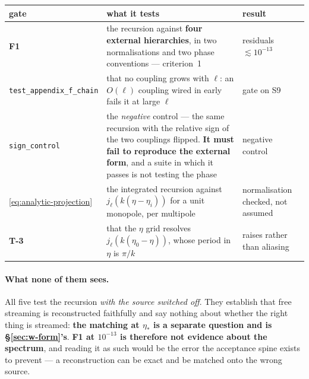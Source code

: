 \begin{center}\small
\begin{tabularx}{\textwidth}{@{}l >{\raggedright\arraybackslash}X l@{}}
\toprule
\textbf{gate} & \textbf{what it tests} & \textbf{result} \\
\midrule
\textbf{F1} & the recursion against \textbf{four external hierarchies}, in two
  normalisations and two phase conventions --- criterion~1 & residuals
  $\lesssim10^{-13}$ \\
\texttt{test\_appendix\_f\_chain} & that no coupling grows with $\ell$: an
  $O(\ell)$ coupling wired in early fails it at large $\ell$ & gate on S9 \\
\texttt{sign\_control} & the \emph{negative} control --- the same recursion
  with the relative sign of the two couplings flipped. \textbf{It must fail to
  reproduce the external form}, and a suite in which it passes is not testing
  the phase & negative control \\
\eqref{eq:analytic-projection} & the integrated recursion against
  $j_\ell(k(\eta-\eta_i))$ for a unit monopole, per multipole & normalisation
  checked, not assumed \\
\textbf{T-3} & that the $\eta$ grid resolves $j_\ell(k(\eta_0-\eta))$, whose
  period in $\eta$ is $\pi/k$ & raises rather than aliasing \\
\bottomrule
\end{tabularx}
\end{center}

\paragraph{What none of them sees.} All five test the recursion \emph{with the
source switched off}. They establish that free streaming is reconstructed
faithfully and say nothing about whether the right thing is streamed:
\textbf{the matching at $\eta_*$ is a separate question and is
\S\ref{sec:w-form}'s}. \textbf{F1 at $10^{-13}$ is therefore not evidence
about the spectrum}, and reading it as such would be the error the acceptance
spine exists to prevent --- a reconstruction can be exact and be matched onto
the wrong source.
